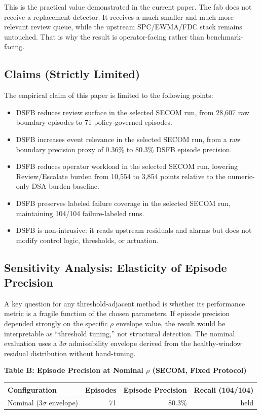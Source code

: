 \documentclass[11pt,letterpaper]{article}
\theoremstyle{scresult}
\begin{document}
This is the practical value demonstrated in the current paper. The fab does not
receive a replacement detector. It receives a much smaller and much more
relevant review queue, while the upstream SPC/EWMA/FDC stack remains untouched.
That is why the result is operator-facing rather than benchmark-facing.

\subsection{Claims (Strictly Limited)}

The empirical claim of this paper is limited to the following points:
\begin{itemize}
  \item DSFB reduces review surface in the selected SECOM run, from 28{,}607
        raw boundary episodes to 71 policy-governed episodes.
  \item DSFB increases event relevance in the selected SECOM run, from a raw
        boundary precision proxy of 0.36\% to 80.3\% DSFB episode precision.
  \item DSFB reduces operator workload in the selected SECOM run, lowering
        Review/Escalate burden from 10{,}554 to 3{,}854 points relative to the
        numeric-only DSA burden baseline.
  \item DSFB preserves labeled failure coverage in the selected SECOM run,
        maintaining 104/104 failure-labeled runs.
  \item DSFB is non-intrusive: it reads upstream residuals and alarms but does
        not modify control logic, thresholds, or actuation.
\end{itemize}

\subsection{Sensitivity Analysis: Elasticity of Episode Precision}
\label{sec:sensitivity}

A key question for any threshold-adjacent method is whether its performance
metric is a fragile function of the chosen parameters.  If episode precision
depended strongly on the specific $\rho$ envelope value, the result would be
interpretable as ``threshold tuning,'' not structural detection.  The nominal
evaluation uses a $3\sigma$ admissibility envelope derived from the healthy-window
residual distribution without hand-tuning.

\begin{center}
\small
\textbf{Table B: Episode Precision at Nominal $\rho$ (SECOM, Fixed Protocol)}\\[4pt]
\begin{tabular}{lrrr}
\toprule
\textbf{Configuration} & \textbf{Episodes} & \textbf{Episode Precision} & \textbf{Recall (104/104)}\\
\midrule
Nominal ($3\sigma$ envelope) & 71 & 80.3\% & held \\
\bottomrule
\end{tabular}
\end{center}
\end{document}

